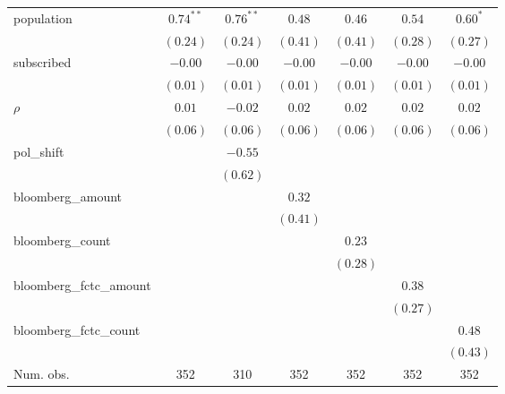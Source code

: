 \begin{table}[!h]
\begin{center}
\begin{tabular}{l c c c c c c }
population              & $0.74^{**}$  & $0.76^{**}$  & $0.48$       & $0.46$       & $0.54$       & $0.60^{*}$   \\
                        & $(0.24)$     & $(0.24)$     & $(0.41)$     & $(0.41)$     & $(0.28)$     & $(0.27)$     \\
subscribed              & $-0.00$      & $-0.00$      & $-0.00$      & $-0.00$      & $-0.00$      & $-0.00$      \\
                        & $(0.01)$     & $(0.01)$     & $(0.01)$     & $(0.01)$     & $(0.01)$     & $(0.01)$     \\
$\rho$                  & $0.01$       & $-0.02$      & $0.02$       & $0.02$       & $0.02$       & $0.02$       \\
                        & $(0.06)$     & $(0.06)$     & $(0.06)$     & $(0.06)$     & $(0.06)$     & $(0.06)$     \\
pol\_shift              &              & $-0.55$      &              &              &              &              \\
                        &              & $(0.62)$     &              &              &              &              \\
bloomberg\_amount       &              &              & $0.32$       &              &              &              \\
                        &              &              & $(0.41)$     &              &              &              \\
bloomberg\_count        &              &              &              & $0.23$       &              &              \\
                        &              &              &              & $(0.28)$     &              &              \\
bloomberg\_fctc\_amount &              &              &              &              & $0.38$       &              \\
                        &              &              &              &              & $(0.27)$     &              \\
bloomberg\_fctc\_count  &              &              &              &              &              & $0.48$       \\
                        &              &              &              &              &              & $(0.43)$     \\
\midrule
Num. obs.               & 352          & 310          & 352          & 352          & 352          & 352          \\

\end{tabular}
\end{center}
\end{table}
